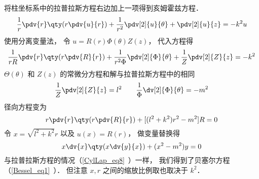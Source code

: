 
\begin{issues}
\issueDraft
\end{issues}


将柱坐标系中的拉普拉斯方程右边加上一项得到亥姆霍兹方程．
\begin{equation}
\frac{1}{r} \pdv{r} \qty(r\pdv{u}{r}) + \frac{1}{r^2} \pdv[2]{u}{\theta} + \pdv[2]{u}{z} = -k^2 u
\end{equation}
使用分离变量法， 令 $u = R(r) \Phi(\theta) Z(z)$， 代入方程得
\begin{equation}
\frac{1}{rR}\pdv{r} \qty(r\pdv{R}{r}) + \frac{1}{r^2 \Phi} \pdv[2]{\Phi}{\theta} + \frac{1}{Z} \pdv[2]{Z}{z} = -k^2
\end{equation}
$\Theta(\theta)$ 和 $Z(z)$ 的常微分方程和解与拉普拉斯方程中的相同
\begin{equation}
\frac{1}{Z} \pdv[2]{Z}{z} = l^2 \qquad
\frac{1}{\Phi } \dv[2]{\Phi}{\theta} = -m^2
\end{equation}
径向方程变为
\begin{equation}
r\pdv{r} \qty(r\pdv{R}{r}) + [(l^2 + k^2)r^2 - m^2]R  = 0
\end{equation}
令 $x = \sqrt{l^2 + k^2}r$ 以及 $u(x) = R(r)$， 做变量替换得
\begin{equation}\label{CylHlm_eq1}
x \dv{x} \qty(x\dv{y}{x}) + (x^2 - m^2)y = 0
\end{equation}
与拉普拉斯方程的情况（\autoref{CylLap_eq8}~）一样， 我们得到了贝塞尔方程（\autoref{Bessel_eq1}~）． 但注意 $x, r$ 之间的缩放比例取也取决于 $k^2$．
